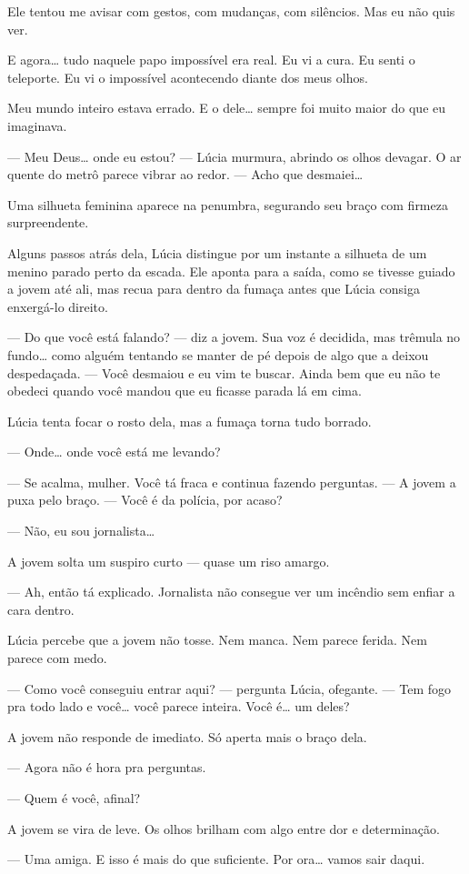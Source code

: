 Ele tentou me avisar com gestos, com mudanças, com silêncios.  
Mas eu não quis ver.

E agora… tudo naquele papo impossível era real.  
Eu vi a cura.  
Eu senti o teleporte.  
Eu vi o impossível acontecendo diante dos meus olhos.

Meu mundo inteiro estava errado.  
E o dele… sempre foi muito maior do que eu imaginava.

\bigskip

— Meu Deus… onde eu estou? — Lúcia murmura, abrindo os olhos devagar. O ar quente do metrô parece vibrar ao redor. — Acho que desmaiei…

Uma silhueta feminina aparece na penumbra, segurando seu braço com firmeza surpreendente.

Alguns passos atrás dela, Lúcia distingue por um instante a silhueta de um menino parado perto da escada. Ele aponta para a saída, como se tivesse guiado a jovem até ali, mas recua para dentro da fumaça antes que Lúcia consiga enxergá-lo direito.

— Do que você está falando? — diz a jovem. Sua voz é decidida, mas trêmula no fundo… como alguém tentando se manter de pé depois de algo que a deixou despedaçada. — Você desmaiou e eu vim te buscar. Ainda bem que eu não te obedeci quando você mandou que eu ficasse parada lá em cima.

Lúcia tenta focar o rosto dela, mas a fumaça torna tudo borrado.

— Onde… onde você está me levando?

— Se acalma, mulher. Você tá fraca e continua fazendo perguntas. — A jovem a puxa pelo braço. — Você é da polícia, por acaso?

— Não, eu sou jornalista…

A jovem solta um suspiro curto — quase um riso amargo.

— Ah, então tá explicado. Jornalista não consegue ver um incêndio sem enfiar a cara dentro.

Lúcia percebe que a jovem não tosse.
Nem manca.  
Nem parece ferida.  
Nem parece com medo.

— Como você conseguiu entrar aqui? — pergunta Lúcia, ofegante. — Tem fogo pra todo lado e você… você parece inteira. Você é… um deles?

A jovem não responde de imediato.
Só aperta mais o braço dela.

— Agora não é hora pra perguntas.

— Quem é você, afinal?

A jovem se vira de leve.
Os olhos brilham com algo entre dor e determinação.

— Uma amiga.  
E isso é mais do que suficiente.  
Por ora… vamos sair daqui.
